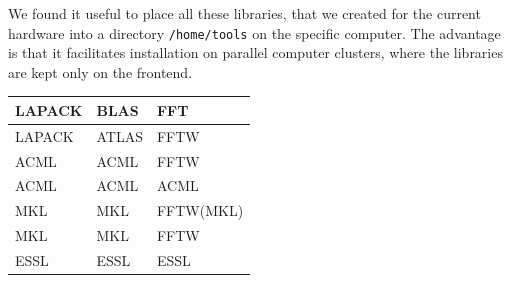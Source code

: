 \documentclass[a4paper,10pt]{report}
\newcommand{\mytt}[1]{{\tt #1}}
\begin{document}
We found it useful to place all these libraries, that we created for
the current hardware into a directory \mytt{/home/tools} on the
specific computer. The advantage is that it facilitates installation
on parallel computer clusters, where the libraries are kept only on the
frontend.

\begin{center}
\begin{tabular}{|l|l|l|}
\hline
LAPACK& BLAS & FFT\\
\hline
LAPACK & ATLAS & FFTW\\
ACML & ACML & FFTW\\
ACML & ACML & ACML\\
MKL & MKL & FFTW(MKL)\\
MKL & MKL & FFTW\\
ESSL & ESSL & ESSL\\
\hline
\end{tabular}
\end{center}




\end{document}
